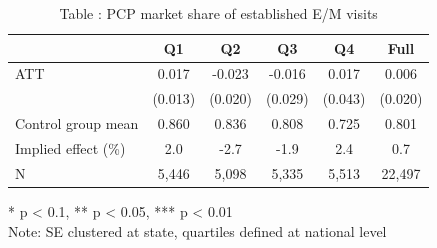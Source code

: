 \begin{table}[t]
\caption*{
{\fontsize{20}{25}\selectfont  Table : PCP market share of established E/M visits\fontsize{12}{15}\selectfont }
} 
\fontsize{12.0pt}{14.0pt}\selectfont
\begin{tabular*}{\linewidth}{@{\extracolsep{\fill}}lccccc}
\toprule
  & Q1 & Q2 & Q3 & Q4 & Full \\ 
\midrule\addlinespace[2.5pt]
ATT & 0.017 & -0.023 & -0.016 & 0.017 & 0.006 \\ 
 & (0.013) & (0.020) & (0.029) & (0.043) & (0.020) \\ 
Control group mean & 0.860 & 0.836 & 0.808 & 0.725 & 0.801 \\ 
Implied effect (\%) & 2.0 & -2.7 & -1.9 & 2.4 & 0.7 \\ 
N & 5,446 & 5,098 & 5,335 & 5,513 & 22,497 \\ 
\bottomrule
\end{tabular*}
\begin{minipage}{\linewidth}
* p < 0.1, ** p < 0.05, *** p < 0.01\\
Note: SE clustered at state, quartiles defined at national level\\
\end{minipage}
\end{table}

